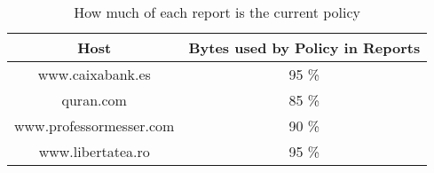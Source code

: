 \begin{table}[H]
\begin{center}
\begin{tabular}{| c c |}
	\hline
	Host & Bytes used by Policy in Reports \\ \hline
	www.caixabank.es        & 95 \% \\ \hline 
	quran.com               & 85 \% \\ \hline 
	www.professormesser.com & 90 \% \\ \hline 
	www.libertatea.ro       & 95 \% \\ \hline 
\end{tabular}
\end{center}
\label{tab:reduction}
	\caption{How much of each report is the current policy}
\end{table}



%



